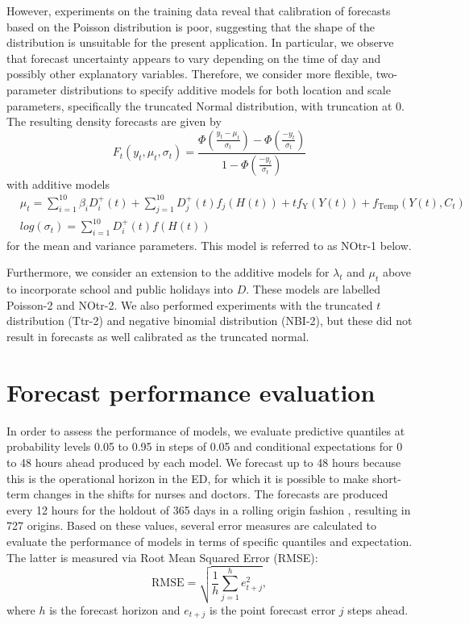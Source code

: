 \documentclass[]{elsarticle} %
\begin{document}
However, experiments on the training data reveal that calibration of
forecasts based on the Poisson distribution is poor, suggesting that the
shape of the distribution is unsuitable for the present application. In
particular, we observe that forecast uncertainty appears to vary
depending on the time of day and possibly other explanatory variables.
Therefore, we consider more flexible, two-parameter distributions to
specify additive models for both location and scale parameters,
specifically the truncated Normal distribution, with truncation at 0.
The resulting density forecasts are given by \begin{equation}
F_t(y_t,\mu_t,\sigma_t) =  \frac{\Phi\left( \frac{y_t-\mu_t}{\sigma_t} \right) - \Phi\left( \frac{-y_t}{\sigma_t} \right)}{1 - \Phi\left( \frac{-y_t}{\sigma_t} \right)}
\label{eq:truncatedn}
\end{equation} with additive models
\begin{align*}
    & \mu_t = \sum_{i=1}^{10} \beta_i D^{+}_i(t) + \sum_{j=1}^{10} D^{+}_j(t) f_j(H(t)) + t f_\text{Y}(Y(t)) + f_\text{Temp}(Y(t),C_t) \\
    & log(\sigma_t) = \sum_{i=1}^{10} D^{+}_i(t) f(H(t))
\end{align*} for the mean and variance parameters. This model is
referred to as NOtr-1 below.

Furthermore, we consider an extension to the additive models for
\(\lambda_t\) and \(\mu_t\) above to incorporate school and public holidays
into \(D\). These models are labelled Poisson-2 and NOtr-2. We also
performed experiments with the truncated \(t\) distribution (Ttr-2) and
negative binomial distribution (NBI-2), but these did not result in
forecasts as well calibrated as the truncated normal.

\hypertarget{accuracy}{%
\section{Forecast performance evaluation}\label{accuracy}}

In order to assess the performance of models, we evaluate predictive
quantiles at probability levels 0.05 to 0.95 in steps of 0.05 and
conditional expectations for 0 to 48 hours ahead produced by each model.
We forecast up to 48 hours because this is the operational horizon in
the ED, for which it is possible to make short-term changes in the
shifts for nurses and doctors. The forecasts are produced every 12 hours
for the holdout of 365 days in a rolling origin fashion \citep{Tashman2000},
resulting in 727 origins. Based on these values, several error measures
are calculated to evaluate the performance of models in terms of
specific quantiles and expectation. The latter is measured via Root Mean
Squared Error (RMSE): \begin{equation}
  \mathrm{RMSE} = \sqrt{\frac{1}{h} \sum_{j=1}^h e_{t+j}^2} ,
  \label{eq:RMSE}
\end{equation} where \(h\) is the forecast horizon and \(e_{t+j}\) is the
point forecast error \(j\) steps ahead.
\end{document}
